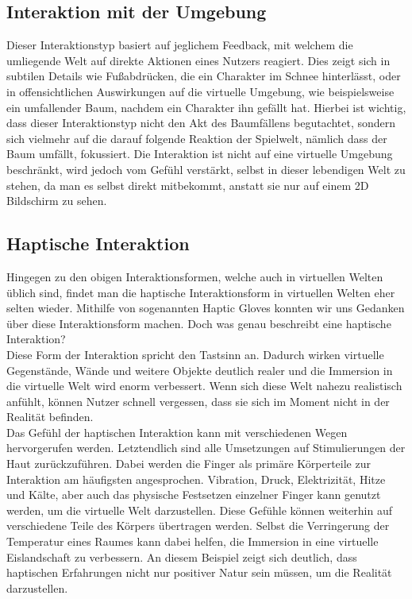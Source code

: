 \subsection{Interaktion mit der Umgebung}
Dieser Interaktionstyp basiert auf jeglichem Feedback, mit welchem die umliegende Welt auf direkte Aktionen eines Nutzers reagiert. Dies zeigt sich in subtilen Details wie Fußabdrücken, die ein Charakter im Schnee hinterlässt, oder in offensichtlichen Auswirkungen auf die virtuelle Umgebung, wie beispielsweise ein umfallender Baum, nachdem ein Charakter ihn gefällt hat. Hierbei ist wichtig, dass dieser Interaktionstyp nicht den Akt des Baumfällens begutachtet, sondern sich vielmehr auf die darauf folgende Reaktion der Spielwelt, nämlich dass der Baum umfällt, fokussiert. Die Interaktion ist nicht auf eine virtuelle Umgebung beschränkt, wird jedoch vom Gefühl verstärkt, selbst in dieser lebendigen Welt zu stehen, da man es selbst direkt mitbekommt, anstatt sie nur auf einem 2D Bildschirm zu sehen.
\newpage
\noindent
\subsection{Haptische Interaktion}
Hingegen zu den obigen Interaktionsformen, welche auch in virtuellen Welten üblich sind, findet man die haptische Interaktionsform in virtuellen Welten eher selten wieder. Mithilfe von sogenannten Haptic Gloves konnten wir uns Gedanken über diese Interaktionsform machen. Doch was genau beschreibt eine haptische Interaktion?\\
Diese Form der Interaktion spricht den Tastsinn an. Dadurch wirken virtuelle Gegenstände, Wände und weitere Objekte deutlich realer und die Immersion in die virtuelle Welt wird enorm verbessert. Wenn sich diese Welt nahezu realistisch anfühlt, können Nutzer schnell vergessen, dass sie sich im Moment nicht in der Realität befinden.\\
Das Gefühl der haptischen Interaktion kann mit verschiedenen Wegen hervorgerufen werden. Letztendlich sind alle Umsetzungen auf Stimulierungen der Haut zurückzuführen. Dabei werden die Finger als primäre Körperteile zur Interaktion am häufigsten angesprochen. Vibration, Druck, Elektrizität, Hitze und Kälte, aber auch das physische Festsetzen einzelner Finger kann genutzt werden, um die virtuelle Welt darzustellen. Diese Gefühle können weiterhin auf verschiedene Teile des Körpers übertragen werden. Selbst die Verringerung der Temperatur eines Raumes kann dabei helfen, die Immersion in eine virtuelle Eislandschaft zu verbessern. An diesem Beispiel zeigt sich deutlich, dass haptischen Erfahrungen nicht nur positiver Natur sein müssen, um die Realität darzustellen.

